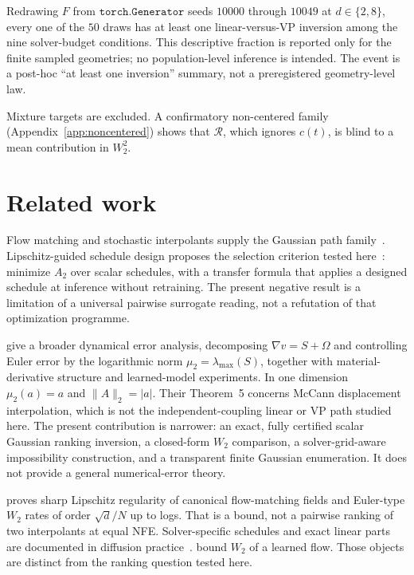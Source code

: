 \documentclass[11pt,a4paper]{article}
\theoremstyle{remark}
\newcommand{\wtwo}{W_2}
\newcommand{\cR}{\mathcal{R}}
\begin{document}
Redrawing $F$ from $\texttt{torch.Generator}$ seeds $10000$ through
$10049$ at $d\in\{2,8\}$, every one of the $50$ draws has at least one
linear-versus-VP inversion among the nine solver-budget conditions.
This descriptive fraction is reported only for the finite sampled
geometries; no population-level inference is intended. The event is a
post-hoc ``at least one inversion'' summary, not a preregistered
geometry-level law.

Mixture targets are excluded. A confirmatory non-centered family
(Appendix~\ref{app:noncentered}) shows that $\cR$, which ignores $c(t)$,
is blind to a mean contribution in $\wtwo^2$.

\section{Related work}
\label{sec:related}

Flow matching and stochastic interpolants supply the Gaussian path
family~\citep{lipman2023flow,albergo2025stochastic,liu2023rectified,tong2024conditional}.
Lipschitz-guided schedule design proposes the selection criterion tested
here~\citep{lipschitzguided2025}: minimize $A_2$ over scalar schedules,
with a transfer formula that applies a designed schedule at inference
without retraining. The present negative result is a limitation of a
universal pairwise surrogate reading, not a refutation of that
optimization programme.

\citet{tao2026strain} give a broader dynamical error analysis, decomposing
$\nabla v=S+\Omega$ and controlling Euler error by the logarithmic norm
$\mu_2=\lambda_{\max}(S)$, together with material-derivative structure and
learned-model experiments. In one dimension $\mu_2(a)=a$ and
$\|A\|_2=|a|$. Their Theorem~5 concerns McCann displacement interpolation,
which is not the independent-coupling linear or VP path studied here.
The present contribution is narrower: an exact, fully certified scalar
Gaussian ranking inversion, a closed-form $W_2$ comparison, a
solver-grid-aware impossibility construction, and a transparent finite
Gaussian enumeration. It does not provide a general numerical-error
theory.

\citet{stephanovitch2026lipschitz} proves sharp Lipschitz regularity of
canonical flow-matching fields and Euler-type $\wtwo$ rates of order
$\sqrt{d}/N$ up to logs. That is a bound, not a pairwise ranking of two
interpolants at equal NFE. Solver-specific schedules and exact linear
parts are documented in diffusion
practice~\citep{sabour2024align,karras2022edm,lu2022dpmsolver,zhang2023deis}.
\citet{benton2024error} bound $\wtwo$ of a learned flow. Those objects
are distinct from the ranking question tested here.
\end{document}
